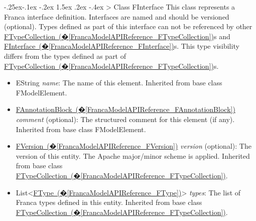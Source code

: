 \documentclass[a4paper,10pt]{scrreprt}
\makeatletter
\renewcommand\subsection{\medskip\@startsection{subsection}{2}{\z@}%
  {-.25ex\@plus -.1ex \@minus -.2ex}%
  {1.5ex \@plus .2ex \@minus -.4ex}%
  {\ifnum \scr@compatibility>\@nameuse{scr@v@2.96}\relax
    \setlength{\parfillskip}{\z@ plus 1fil}\fi
    \raggedsection\normalfont\sectfont\nobreak\size@subsection
  }%
}
\newlength{\XdocItemIndent}
\makeatother
\begin{document}
\subsection{Class FInterface}
\label{FrancaModelAPIReference_FInterface}
This class represents a Franca interface definition.
Interfaces are named and should be versioned (optional).
Types defined as part of this interface can not be referenced
by other \hyperref[FrancaModelAPIReference_FTypeCollection]{FTypeCollection~(�\ref*{FrancaModelAPIReference_FTypeCollection})}s and \hyperref[FrancaModelAPIReference_FInterface]{FInterface~(�\ref*{FrancaModelAPIReference_FInterface})}s. This type visibility
differs from the types defined as part of \hyperref[FrancaModelAPIReference_FTypeCollection]{FTypeCollection~(�\ref*{FrancaModelAPIReference_FTypeCollection})}s.
\setlength{\XdocItemIndent}{\textwidth}
\begin{itemize}
\addtolength{\XdocItemIndent}{-2.5em}
\item \begin{minipage}[t]{\XdocItemIndent}
EString \textit{name}: The name of this element.
		 Inherited from base class FModelElement.

\end{minipage}
\item \begin{minipage}[t]{\XdocItemIndent}
\hyperref[FrancaModelAPIReference_FAnnotationBlock]{FAnnotationBlock~(�\ref*{FrancaModelAPIReference_FAnnotationBlock})} \textit{comment} (optional): The structured comment for this element (if any).
		 Inherited from base class FModelElement.

\end{minipage}
\item \begin{minipage}[t]{\XdocItemIndent}
\hyperref[FrancaModelAPIReference_FVersion]{FVersion~(�\ref*{FrancaModelAPIReference_FVersion})} \textit{version} (optional): The version of this entity. The Apache major/minor scheme is applied.
		 Inherited from base class \hyperref[FrancaModelAPIReference_FTypeCollection]{FTypeCollection~(�\ref*{FrancaModelAPIReference_FTypeCollection})}.

\end{minipage}
\item \begin{minipage}[t]{\XdocItemIndent}
List<\hyperref[FrancaModelAPIReference_FType]{FType~(�\ref*{FrancaModelAPIReference_FType})}> \textit{types}: The list of Franca types defined in this entity.
		 Inherited from base class \hyperref[FrancaModelAPIReference_FTypeCollection]{FTypeCollection~(�\ref*{FrancaModelAPIReference_FTypeCollection})}.


\end{minipage}
\end{itemize}
\end{document}
